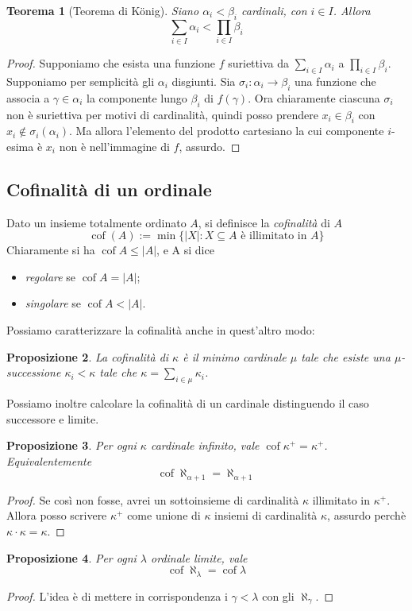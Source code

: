 \documentclass[a4paper,10pt,oneside]{article}
\DeclareMathOperator{\cof}{cof}
\newcommand{\myname}[1]{\emph{#1}}
\newcommand{\nin}{\not\in}
\theoremstyle{plain}
\newtheorem{mytheorem}{Teorema}[section]
\newtheorem{myprop}[mytheorem]{Proposizione}
\theoremstyle{definition}
\theoremstyle{remark}
\begin{document}
\begin{mytheorem}[Teorema di K\"onig]
  Siano $\alpha_i<\beta_i$ cardinali, con $i\in I$. Allora \[\sum_{i\in I} \alpha_i < \prod_{i\in I} \beta_i\]
\end{mytheorem}

\begin{proof} Supponiamo che esista una funzione $f$ suriettiva da $\sum_{i\in I} \alpha_i$ a $\prod_{i\in I} \beta_i$. Supponiamo per semplicità gli $\alpha_i$ disgiunti. Sia $\sigma_i: \alpha_i\rightarrow \beta_i$ una funzione che associa a $\gamma \in \alpha_i$ la componente lungo $\beta_i$ di $f (\gamma)$. Ora chiaramente ciascuna $\sigma_i$ non è suriettiva per motivi di cardinalità, quindi posso prendere $x_i \in \beta_i$ con $x_i \nin \sigma_i(\alpha_i)$. Ma allora l'elemento del prodotto cartesiano la cui componente $i$-esima è $x_i$ non è nell'immagine di $f$, assurdo.
\end{proof}

\subsection{Cofinalità di un ordinale}

Dato un insieme totalmente ordinato $A$, si definisce la \myname{cofinalità} di $A$
\[ \cof(A) := \min\{|X|:X\subseteq A \textrm{ è illimitato in }A\}\]  
Chiaramente si ha $\cof A \le |A|$, e A si dice
\begin{itemize}
 \item \myname{regolare} se $\cof A=|A|$;
 \item \myname{singolare} se $\cof A<|A|$.
\end{itemize}

Possiamo caratterizzare la cofinalità anche in quest'altro modo:
\begin{myprop}

 La cofinalità di $\kappa$ è il minimo cardinale $\mu$ tale che esiste una $\mu$-successione $\kappa_i<\kappa$ tale che $\kappa =\sum_{i\in \mu} \kappa_i$.
\end{myprop}

Possiamo inoltre calcolare la cofinalità di un cardinale distinguendo il caso successore e limite.
\begin{myprop}
 Per ogni $\kappa$ cardinale infinito, vale $\cof\kappa^+ = \kappa^+$. Equivalentemente \[\cof\aleph_{\alpha+1}=\aleph_{\alpha+1}\]
\end{myprop}
\begin{proof}
 Se così non fosse, avrei un sottoinsieme di cardinalità $\kappa$ illimitato in $\kappa^+$. Allora posso scrivere $\kappa^+$ come unione di $\kappa$ insiemi di cardinalità $\kappa$, assurdo perchè $\kappa\cdot\kappa=\kappa$.
\end{proof}
\begin{myprop}
 Per ogni $\lambda$ ordinale limite, vale \[\cof \aleph_\lambda =\cof \lambda\]
\end{myprop}
\begin{proof}
 L'idea è di mettere in corrispondenza i $\gamma < \lambda$ con gli $\aleph_\gamma$.
\end{proof}
\end{document}
